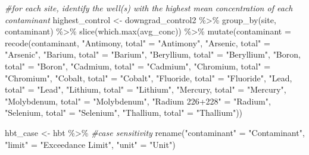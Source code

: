 \documentclass[12pt, twoside]{amherstthesis}
\newenvironment{Shaded}{\begin{snugshade}}{\end{snugshade}}
\newcommand{\AttributeTok}[1]{\textcolor[rgb]{0.77,0.63,0.00}{#1}}
\newcommand{\CommentTok}[1]{\textcolor[rgb]{0.56,0.35,0.01}{\textit{#1}}}
\newcommand{\FunctionTok}[1]{\textcolor[rgb]{0.00,0.00,0.00}{#1}}
\newcommand{\NormalTok}[1]{#1}
\newcommand{\OtherTok}[1]{\textcolor[rgb]{0.56,0.35,0.01}{#1}}
\newcommand{\SpecialCharTok}[1]{\textcolor[rgb]{0.00,0.00,0.00}{#1}}
\newcommand{\StringTok}[1]{\textcolor[rgb]{0.31,0.60,0.02}{#1}}
\begin{document}
\begin{Shaded}
\begin{Highlighting}[]
\CommentTok{\#for each site, identify the well(s) with the highest mean concentration of each contaminant}
\NormalTok{highest\_control }\OtherTok{\textless{}{-}}\NormalTok{ downgrad\_control2 }\SpecialCharTok{\%\textgreater{}\%}
  \FunctionTok{group\_by}\NormalTok{(site, contaminant) }\SpecialCharTok{\%\textgreater{}\%}
  \FunctionTok{slice}\NormalTok{(}\FunctionTok{which.max}\NormalTok{(avg\_conc)) }\SpecialCharTok{\%\textgreater{}\%}
  \FunctionTok{mutate}\NormalTok{(}\AttributeTok{contaminant =} \FunctionTok{recode}\NormalTok{(contaminant,}
                              \StringTok{"Antimony, total"} \OtherTok{=} \StringTok{"Antimony"}\NormalTok{,}
                              \StringTok{"Arsenic, total"} \OtherTok{=} \StringTok{"Arsenic"}\NormalTok{,}
                              \StringTok{"Barium, total"} \OtherTok{=} \StringTok{"Barium"}\NormalTok{,}
                              \StringTok{"Beryllium, total"} \OtherTok{=} \StringTok{"Beryllium"}\NormalTok{,}
                              \StringTok{"Boron, total"} \OtherTok{=} \StringTok{"Boron"}\NormalTok{,}
                              \StringTok{"Cadmium, total"} \OtherTok{=} \StringTok{"Cadmium"}\NormalTok{,}
                              \StringTok{"Chromium, total"} \OtherTok{=} \StringTok{"Chromium"}\NormalTok{,}
                              \StringTok{"Cobalt, total"} \OtherTok{=} \StringTok{"Cobalt"}\NormalTok{,}
                              \StringTok{"Fluoride, total"} \OtherTok{=} \StringTok{"Fluoride"}\NormalTok{,}
                              \StringTok{"Lead, total"} \OtherTok{=} \StringTok{"Lead"}\NormalTok{,}
                              \StringTok{"Lithium, total"} \OtherTok{=} \StringTok{"Lithium"}\NormalTok{,}
                              \StringTok{"Mercury, total"} \OtherTok{=} \StringTok{"Mercury"}\NormalTok{,}
                              \StringTok{"Molybdenum, total"} \OtherTok{=} \StringTok{"Molybdenum"}\NormalTok{,}
                              \StringTok{"Radium 226+228"} \OtherTok{=} \StringTok{"Radium"}\NormalTok{,}
                              \StringTok{"Selenium, total"} \OtherTok{=} \StringTok{"Selenium"}\NormalTok{,}
                              \StringTok{"Thallium, total"} \OtherTok{=} \StringTok{"Thallium"}\NormalTok{))}

\NormalTok{hbt\_case }\OtherTok{\textless{}{-}}\NormalTok{ hbt }\SpecialCharTok{\%\textgreater{}\%} \CommentTok{\#case sensitivity}
  \FunctionTok{rename}\NormalTok{(}\StringTok{"contaminant"} \OtherTok{=} \StringTok{"Contaminant"}\NormalTok{,}
         \StringTok{"limit"} \OtherTok{=} \StringTok{"Exceedance Limit"}\NormalTok{,}
         \StringTok{"unit"} \OtherTok{=} \StringTok{"Unit"}\NormalTok{) }
  

\end{Highlighting}
\end{Shaded}
\end{document}
